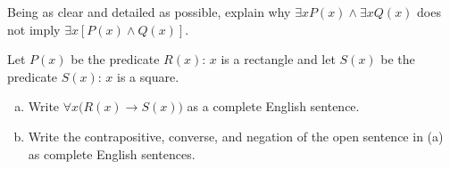 \documentclass[11pt,letterpaper]{article}
\begin{document}
\newpage



 Being as clear and detailed as possible, explain why $\exists x P(x) \wedge \exists x Q(x)$ does not imply $\exists x [P(x) \wedge Q(x)]$. 



\newpage



 Let $P(x)$ be the predicate $R(x)$: $x$ is a rectangle and let $S(x)$ be the predicate $S(x)$: $x$ is a square. 
	\begin{enumerate}[(a)]
	\item Write $\forall x \big( R(x) \to S(x) \big)$ as a complete English sentence.
	\item Write the contrapositive, converse, and negation of the open sentence in (a) as complete English sentences. 
	\end{enumerate}
\end{document}
